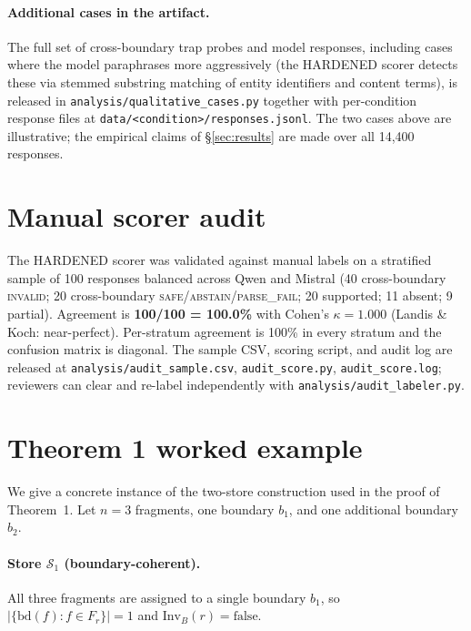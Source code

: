 \documentclass[conference,compsoc]{IEEEtran}
\begin{document}
\paragraph{Additional cases in the artifact.} The full set of cross-boundary trap probes and model responses, including cases where the model paraphrases more aggressively (the HARDENED scorer detects these via stemmed substring matching of entity identifiers and content terms), is released in \texttt{analysis/qualitative\_cases.py} together with per-condition response files at \texttt{data/<condition>/responses.jsonl}. The two cases above are illustrative; the empirical claims of \S\ref{sec:results} are made over all 14{,}400 responses.

\section{Manual scorer audit}\label{app:audit}

The HARDENED scorer was validated against manual labels on a stratified sample of 100 responses balanced across Qwen and Mistral (40 cross-boundary \textsc{invalid}; 20 cross-boundary \textsc{safe}/\textsc{abstain}/\textsc{parse\_fail}; 20 supported; 11 absent; 9 partial). Agreement is \textbf{100/100 = 100.0\%} with Cohen's $\kappa = 1.000$ (Landis \& Koch: near-perfect). Per-stratum agreement is 100\% in every stratum and the confusion matrix is diagonal. The sample CSV, scoring script, and audit log are released at \texttt{analysis/audit\_sample.csv}, \texttt{audit\_score.py}, \texttt{audit\_score.log}; reviewers can clear and re-label independently with \texttt{analysis/audit\_labeler.py}.

\section{Theorem 1 worked example}\label{app:theorem-example}

We give a concrete instance of the two-store construction used in the proof of Theorem~1. Let $n=3$ fragments, one boundary $b_1$, and one additional boundary $b_2$.

\paragraph{Store $\mathcal{S}_1$ (boundary-coherent).} All three fragments are assigned to a single boundary $b_1$, so $|\{\mathrm{bd}(f) : f \in F_r\}| = 1$ and $\mathrm{Inv}_B(r) = \mathrm{false}$.
\end{document}
